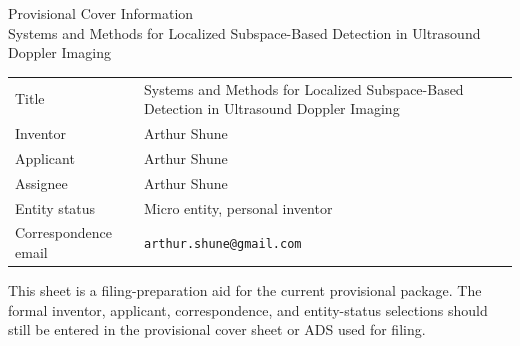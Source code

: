 \documentclass[11pt]{article}
\begin{document}
\begin{center}
{\Large Provisional Cover Information}\\[0.5em]
{\large Systems and Methods for Localized Subspace-Based Detection in Ultrasound Doppler Imaging}
\end{center}

\vspace{1em}

\small
\begin{tabularx}{\textwidth}{@{}l>{\raggedright\arraybackslash}X@{}}
\toprule
Title & Systems and Methods for Localized Subspace-Based Detection in Ultrasound Doppler Imaging \\
Inventor & Arthur Shune \\
Applicant & Arthur Shune \\
Assignee & Arthur Shune \\
Entity status & Micro entity, personal inventor \\
Correspondence email & \texttt{arthur.shune@gmail.com} \\
\bottomrule
\end{tabularx}
\normalsize

\vspace{1.5em}

\noindent This sheet is a filing-preparation aid for the current provisional package. The formal inventor, applicant, correspondence, and entity-status selections should still be entered in the provisional cover sheet or ADS used for filing.
\end{document}
